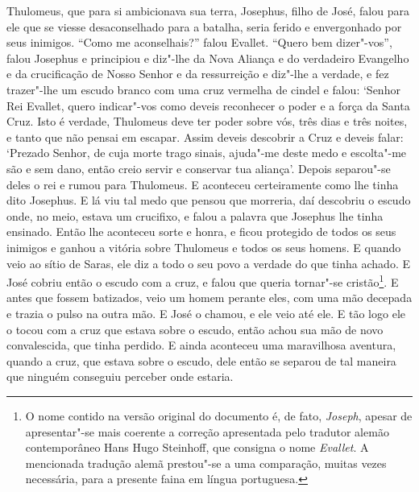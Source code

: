 Thulomeus, que para si ambicionava sua terra, Josephus, filho de José, falou
para ele que se viesse desaconselhado para a batalha, seria ferido e
envergonhado por seus inimigos. “Como me aconselhais?” falou Evallet. “Quero
bem dizer"-vos”, falou Josephus e principiou e diz"-lhe da Nova Aliança e do
verdadeiro Evangelho e da crucificação de Nosso Senhor e da ressurreição e
diz"-lhe a verdade, e fez trazer"-lhe um escudo branco com uma cruz vermelha de
cindel e falou: ‘Senhor Rei Evallet, quero indicar"-vos como deveis reconhecer o
poder e a força da Santa Cruz. Isto é verdade, Thulomeus deve ter poder sobre
vós, três dias e três noites, e tanto que não pensai em escapar. Assim deveis
descobrir a Cruz e deveis falar: ‘Prezado Senhor, de cuja morte trago sinais,
ajuda"-me deste medo e escolta"-me são e sem dano, então creio servir e conservar
tua aliança’. Depois separou"-se deles o rei e rumou para Thulomeus. E aconteceu
certeiramente como lhe tinha dito Josephus. E lá viu tal medo que pensou que
morreria, daí descobriu o escudo onde, no meio, estava um crucifixo, e falou a
palavra que Josephus lhe tinha ensinado. Então lhe aconteceu sorte e honra, e
ficou protegido de todos os seus inimigos e ganhou a vitória sobre Thulomeus e
todos os seus homens. E quando veio ao sítio de Saras, ele diz a todo o seu povo
a verdade do que tinha achado. E José cobriu então o escudo com a cruz, e falou
que queria tornar"-se cristão\footnote{ O nome contido na versão original do
documento é, de fato, \textit{Joseph}, apesar de apresentar"-se mais coerente a
correção apresentada pelo tradutor alemão contemporâneo Hans Hugo Steinhoff,
que consigna o nome \textit{Evallet}. A mencionada tradução alemã prestou"-se a
uma comparação, muitas vezes necessária, para a presente faina em língua
portuguesa.}. E antes que fossem batizados, veio um homem perante
eles, com uma mão decepada e trazia o pulso na outra mão. E José o chamou, e
ele veio até ele. E tão logo ele o tocou com a cruz que estava sobre o escudo,
então achou sua mão de novo convalescida, que tinha perdido. E ainda aconteceu
uma maravilhosa aventura, quando a cruz, que estava sobre o escudo, dele então
se separou de tal maneira que ninguém conseguiu perceber onde estaria. 

